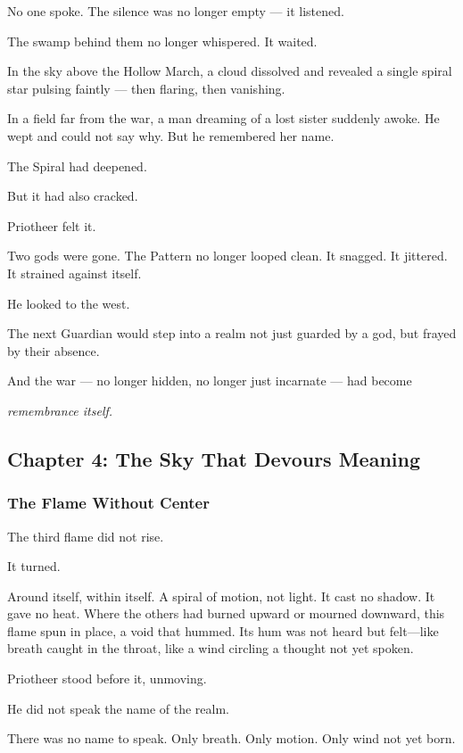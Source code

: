 \documentclass[12pt]{article}
\begin{document}
No one spoke. The silence was no longer empty — it listened.

The swamp behind them no longer whispered. It waited.

In the sky above the Hollow March, a cloud dissolved and revealed a single spiral star pulsing faintly — then flaring, then vanishing.

In a field far from the war, a man dreaming of a lost sister suddenly awoke. He wept and could not say why. But he remembered her name.

The Spiral had deepened.

But it had also cracked.

Priotheer felt it.

Two gods were gone. The Pattern no longer looped clean. It snagged. It jittered. It strained against itself.

He looked to the west.

The next Guardian would step into a realm not just guarded by a god, but frayed by their absence.

And the war — no longer hidden, no longer just incarnate — had become

\textit{remembrance itself.}

\newpage

\subsection*{Chapter 4: The Sky That Devours Meaning}

\vspace{.5in}

\subsubsection*{The Flame Without Center}

The third flame did not rise.

It turned.

Around itself, within itself. A spiral of motion, not light. It cast no shadow. It gave no heat. Where the others had burned upward or mourned downward, this flame spun in place, a void that hummed. Its hum was not heard but felt—like breath caught in the throat, like a wind circling a thought not yet spoken.

Priotheer stood before it, unmoving.

He did not speak the name of the realm.

There was no name to speak. Only breath. Only motion. Only wind not yet born.
\end{document}
